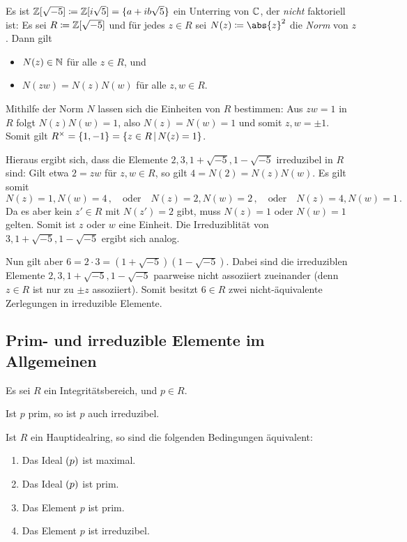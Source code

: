 \begin{example}
  Es ist $\mathbb{Z}[\sqrt{-5}] \coloneqq \mathbb{Z}[i\sqrt{5}] = \{a + ib\sqrt{5}\}$ ein Unterring von $\mathbb{C}$, der \emph{nicht} faktoriell ist:
  Es sei $R \coloneqq \mathbb{Z}[\sqrt{-5}]$ und für jedes $z \in R$ sei $N(z) \defined \abs{z}^2$ die \emph{Norm} von $z$.
  Dann gilt
  \begin{itemize}
    \item
      $N(z) \in \mathbb{N}$ für alle $z \in R$, und
    \item
      $N(zw) = N(z) N(w)$ für alle $z, w \in R$.
  \end{itemize}
  
  Mithilfe der Norm $N$ lassen sich die Einheiten von $R$ bestimmen:
  Aus $zw = 1$ in $R$ folgt $N(z)N(w) = 1$, also $N(z) = N(w) = 1$ und somit $z, w = \pm 1$.
  Somit gilt $\unitgroup{R} = \{1, -1\} = \{z \in R \suchthat N(z) = 1\}$.
  
  Hieraus ergibt sich, dass die Elemente $2, 3, 1 + \sqrt{-5}, 1 - \sqrt{-5}$ irreduzibel in $R$ sind:
  Gilt etwa $2 = zw$ für $z,w \in R$, so gilt $4 = N(2) = N(z)N(w)$.
  Es gilt somit
  \[
    N(z) = 1, N(w) = 4 \,,
    \quad\text{oder}\quad
    N(z) = 2, N(w) = 2 \,,
    \quad\text{oder}\quad
    N(z) = 4, N(w) = 1 \,.
  \]
  Da es aber kein $z' \in R$ mit $N(z') = 2$ gibt, muss $N(z) = 1$ oder $N(w) = 1$ gelten.
  Somit ist $z$ oder $w$ eine Einheit.
  Die Irreduziblität von $3, 1 + \sqrt{-5}, 1 - \sqrt{-5}$ ergibt sich analog.
  
  Nun gilt aber $6 = 2 \cdot 3 = (1 + \sqrt{-5})(1 - \sqrt{-5})$.
  Dabei sind die irreduziblen Elemente $2, 3, 1 + \sqrt{-5}, 1 - \sqrt{-5}$ paarweise nicht assoziiert zueinander (denn $z \in R$ ist nur zu $\pm z$ assoziiert).
  Somit besitzt $6 \in R$ zwei nicht-äquivalente Zerlegungen in irreduzible Elemente.
\end{example}




\subsection{Prim- und irreduzible Elemente im Allgemeinen}

Es sei $R$ ein Integritätsbereich, und $p \in R$.

\begin{lemma}
  Ist $p$ prim, so ist $p$ auch irreduzibel.
\end{lemma}

\begin{lemma}
  Ist $R$ ein Hauptidealring, so sind die folgenden Bedingungen äquivalent:
  \begin{enumerate}
    \item
      Das Ideal $(p)$ ist maximal.
    \item
      Das Ideal $(p)$ ist prim.
    \item
      Das Element $p$ ist prim.
    \item
      Das Element $p$ ist irreduzibel.

  \end{enumerate}
\end{lemma}

